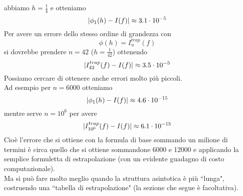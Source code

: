 abbiamo $h = \frac{1}{4}$ e otteniamo
\[\lvert\phi_1(h) - I(f)\rvert \approx 3.1 \cdot 10^{-5}\]
Per avere un errore dello stesso ordine di grandezza con 
\[\phi(h) = I_n^{trap} (f)\]
si dovrebbe prendere $n=42$ ($h=\frac{1}{42}$) ottenendo
\[\lvert I_{42}^{trap}(f) - I(f)\rvert \approx 3.5 \cdot 10^{-5}\]
Possiamo cercare di ottenere anche errori molto più piccoli.\\
Ad esempio per $n=6000$ otteniamo
\[\lvert\phi_1(h) - I(f)\rvert \approx 4.6 \cdot 10^{-15}\]
mentre serve $n = 10^6$ per avere
\[\lvert I_{10^6}^{trap}(f) - I(f)\rvert \approx 6.1 \cdot 10^{-15}\]
Cioè l'errore che si ottiene con la formula di base sommando un milione di termini è circa quello che si ottiene sommandone 6000 e  12000 e applicando la semplice formuletta di estrapolazione (con un evidente guadagno di costo computazionale).\\
Ma si può fare molto meglio quando la struttura asintotica è più ``lunga", costruendo una ``tabella di estrapolazione" (la sezione che segue è facoltativa).

